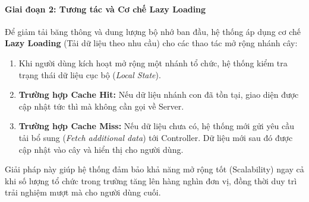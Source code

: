 \paragraph{Giai đoạn 2: Tương tác và Cơ chế Lazy Loading}
Để giảm tải băng thông và dung lượng bộ nhớ ban đầu, hệ thống áp dụng cơ chế \textbf{Lazy Loading} (Tải dữ liệu theo nhu cầu) cho các thao tác mở rộng nhánh cây:
\begin{enumerate}
    \item Khi người dùng kích hoạt mở rộng một nhánh tổ chức, hệ thống kiểm tra trạng thái dữ liệu cục bộ (\textit{Local State}).
    \item \textbf{Trường hợp Cache Hit:} Nếu dữ liệu nhánh con đã tồn tại, giao diện được cập nhật tức thì mà không cần gọi về Server.
    \item \textbf{Trường hợp Cache Miss:} Nếu dữ liệu chưa có, hệ thống mới gửi yêu cầu tải bổ sung (\textit{Fetch additional data}) tới Controller. Dữ liệu mới sau đó được cập nhật vào cây và hiển thị cho người dùng.
\end{enumerate}

Giải pháp này giúp hệ thống đảm bảo khả năng mở rộng tốt (Scalability) ngay cả khi số lượng tổ chức trong trường tăng lên hàng nghìn đơn vị, đồng thời duy trì trải nghiệm mượt mà cho người dùng cuối.